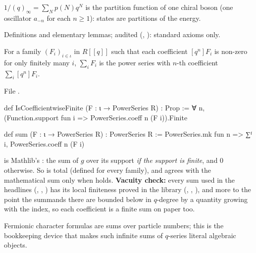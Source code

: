 \begin{physics}
$1/(q)_\infty=\sum_N p(N)q^N$ is the partition function of one chiral boson (one oscillator $a_{-n}$ for
each $n\ge1$): states are partitions of the energy.
\end{physics}

\begin{status}
Definitions and elementary lemmas; audited (, ): standard
axioms only.
\end{status}

\begin{definition}\label{l20:def:lfsum}
For a family $(F_i)_{i\in\iota}$ in $R[[q]]$ such that each coefficient $[q^n]F_i$ is non-zero for only
finitely many $i$, $\sum_iF_i$ is the power series with $n$-th coefficient $\sum_i[q^n]F_i$.
\end{definition}
\noindent File .
\begin{leancode}
def IsCoefficientwiseFinite (F : ι → PowerSeries R) : Prop :=
  ∀ n, (Function.support fun i => PowerSeries.coeff n (F i)).Finite

def sum (F : ι → PowerSeries R) : PowerSeries R :=
  PowerSeries.mk fun n => ∑ᶠ i, PowerSeries.coeff n (F i)
\end{leancode}

\begin{dictionary}
 is Mathlib's : the sum of $g$ over its support \emph{if the support is finite},
and $0$ otherwise. So  is total (defined for every family), and agrees with the mathematical sum
only when  holds. \textbf{Vacuity check:} every sum used in the headlines
(, , ) has its local finiteness proved
in the library (, ,
), and more to the point the summands there are bounded below in $q$-degree by
a quantity growing with the index, so each coefficient is a finite sum on paper too.
\end{dictionary}

\begin{physics}
Fermionic character formulas are sums over particle numbers; this is the bookkeeping device that makes such
infinite sums of $q$-series literal algebraic objects.
\end{physics}


